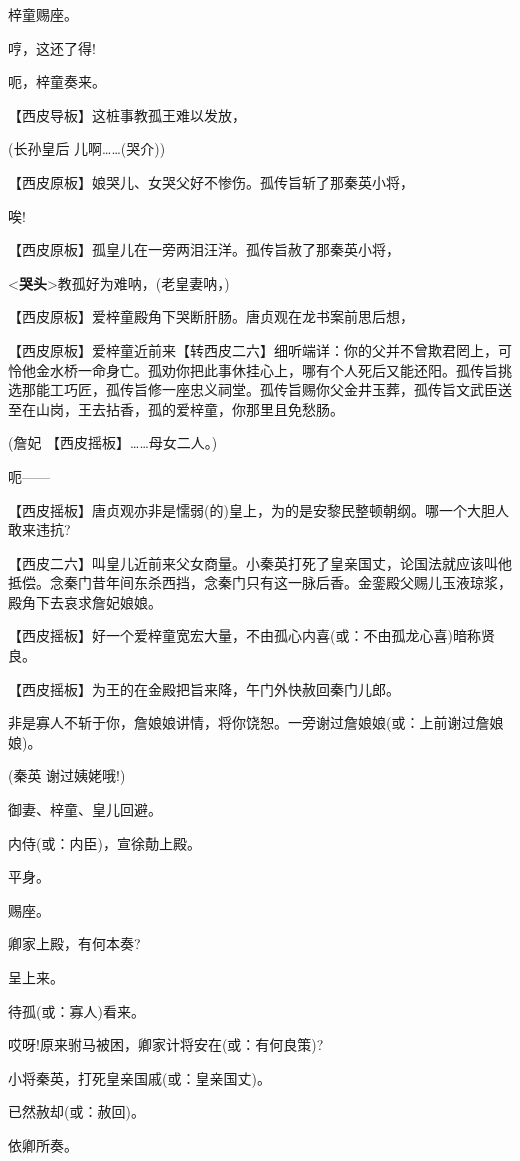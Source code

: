 梓童赐座。

哼，这还了得!

呃，梓童奏来。

【西皮导板】这桩事教孤王难以发放，

(长孙皇后 儿啊\ldots{}\ldots{}(哭介))

【西皮原板】娘哭儿、女哭父好不惨伤。孤传旨斩了那秦英小将，

唉!

【西皮原板】孤皇儿在一旁两泪汪洋。孤传旨赦了那秦英小将，

\textless{}\textbf{哭头}\textgreater{}教孤好为难呐，(老皇妻呐，)

【西皮原板】爱梓童殿角下哭断肝肠。唐贞观在龙书案前思后想，

【西皮原板】爱梓童近前来【转西皮二六】细听端详：你的父并不曾欺君罔上，可怜他金水桥一命身亡。孤劝你把此事休挂心上，哪有个人死后又能还阳。孤传旨挑选那能工巧匠，孤传旨修一座忠义祠堂。孤传旨赐你父金井玉葬，孤传旨文武臣送至在山岗，王去拈香，孤的爱梓童，你那里且免愁肠。

(詹妃 【西皮摇板】\ldots{}\ldots{}母女二人。)

呃------

【西皮摇板】唐贞观亦非是懦弱(的)皇上，为的是安黎民整顿朝纲。哪一个大胆人敢来违抗?

【西皮二六】叫皇儿近前来父女商量。小秦英打死了皇亲国丈，论国法就应该叫他抵偿。念秦门昔年间东杀西挡，念秦门只有这一脉后香。金銮殿父赐儿玉液琼浆，殿角下去哀求詹妃娘娘。

【西皮摇板】好一个爱梓童宽宏大量，不由孤心内喜(或：不由孤龙心喜)暗称贤良。

【西皮摇板】为王的在金殿把旨来降，午门外快赦回秦门儿郎。

非是寡人不斩于你，詹娘娘讲情，将你饶恕。一旁谢过詹娘娘(或：上前谢过詹娘娘)。

(秦英 谢过姨姥哦!)

御妻、梓童、皇儿回避。

内侍(或：内臣)，宣徐勣上殿。

平身。

赐座。

卿家上殿，有何本奏?

呈上来。

待孤(或：寡人)看来。

哎呀!原来驸马被困，卿家计将安在(或：有何良策)?

小将秦英，打死皇亲国戚(或：皇亲国丈)。

已然赦却(或：赦回)。

依卿所奏。

